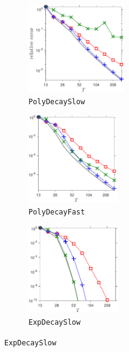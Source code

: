\documentclass[final]{siamart1116}
\numberwithin{equation}{section}
\numberwithin{theorem}{section}
\numberwithin{figure}{section}
\begin{document}
\begin{figure}[htp!]
\begin{center}
\begin{subfigure}{.325\textwidth}
\begin{center}
\includegraphics[height=1.5in]{figures/PSLOW.pdf}
\caption{\texttt{PolyDecaySlow}}
\label{fig:PSLOW-theory}
\end{center}
\end{subfigure}
\begin{subfigure}{.325\textwidth}
\begin{center}
\includegraphics[height=1.5in]{figures/PFAST.pdf}
\caption{\texttt{PolyDecayFast}}
\label{fig:PFAST-theory}
\end{center}
\end{subfigure}
\begin{subfigure}{.325\textwidth}
\begin{center}
\includegraphics[height=1.5in]{figures/ESLOW.pdf}
\caption{\texttt{ExpDecaySlow}}
\label{fig:ESLOW-theory}
\end{center}
\end{subfigure}
\end{center}

\vspace{0.5em}


\end{figure}
\end{document}
